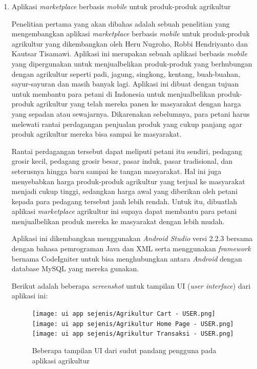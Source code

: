 \documentclass[a4paper]{article}
\begin{document}
\begin{enumerate}
    \item Aplikasi \textit{marketplace} berbasis \textit{mobile} untuk produk-produk agrikultur

    Penelitian pertama yang akan dibahas adalah sebuah penelitian yang mengembangkan aplikasi \textit{marketplace} berbasis \textit{mobile} untuk produk-produk agrikultur yang dikembangkan oleh Heru Nugroho, Robbi Hendriyanto dan Kautsar Tisamawi. Aplikasi ini merupakan sebuah aplikasi berbasis \textit{mobile} yang dipergunakan untuk menjualbelikan produk-produk yang berhubungan dengan agrikultur seperti padi, jagung, singkong, kentang, buah-buahan, sayur-sayuran dan masih banyak lagi. Aplikasi ini dibuat dengan tujuan untuk membantu para petani di Indonesia untuk menjualbelikan produk-produk agrikultur yang telah mereka panen ke masyarakat dengan harga yang sepadan atau sewajarnya. Dikarenakan sebelumnya, para petani harus melewati rantai perdagangan penjualan produk yang cukup panjang agar produk agrikultur mereka bisa sampai ke masyarakat\autocite{agriculture-marketplace}.

    Rantai perdagangan tersebut dapat meliputi petani itu sendiri, pedagang grosir kecil, pedagang grosir besar, pasar induk, pasar tradisional, dan seterusnya hingga baru sampai ke tangan masyarakat. Hal ini juga menyebabkan harga produk-produk agrikultur yang terjual ke masyarakat menjadi cukup tinggi, sedangkan harga awal yang diberikan oleh petani kepada para pedagang tersebut jauh lebih rendah. Untuk itu, dibuatlah aplikasi \textit{marketplace} agrikultur ini supaya dapat membantu para petani menjualbelikan produk mereka ke masyarakat dengan lebih mudah\autocite{agriculture-marketplace}.

    Aplikasi ini dikembangkan menggunakan \textit{Android Studio} versi 2.2.3 bersama dengan bahasa pemrograman Java dan XML serta menggunakan \textit{framework} bernama CodeIgniter untuk bisa menghubungkan antara \textit{Android} dengan database MySQL yang mereka gunakan\autocite{agriculture-marketplace}.

    \newpage
    Berikut adalah beberapa \textit{screenshot} untuk tampilan UI (\textit{user interface}) dari aplikasi ini:
    \begin{figure}[h]
        \centering
        \texttt{[image: ui app sejenis/Agrikultur Cart - USER.png]}\hfill
        \texttt{[image: ui app sejenis/Agrikultur Home Page - USER.png]}\hfill
        \texttt{[image: ui app sejenis/Agrikultur Transaksi - USER.png]}
        \caption{Beberapa tampilan UI dari sudut pandang pengguna pada aplikasi agrikultur}
    \end{figure}


\end{enumerate}
\end{document}
